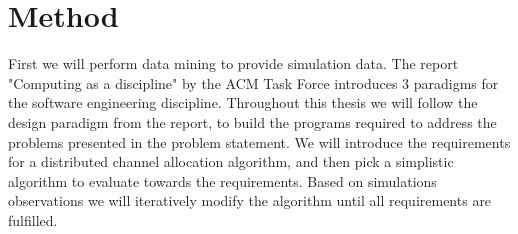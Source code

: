 %
%

\section{Method}
First we will perform data mining to provide simulation data. The report "Computing as a discipline" by the ACM Task Force \cite{Denning} introduces 3 paradigms for the software engineering discipline. Throughout this thesis we will follow the design paradigm from the report, to build the programs required to address the problems presented in the problem statement. We will introduce the requirements for a distributed channel allocation algorithm, and then 
pick a simplistic algorithm to evaluate towards the requirements. Based on simulations observations we will iteratively modify the algorithm until all requirements are fulfilled. 

